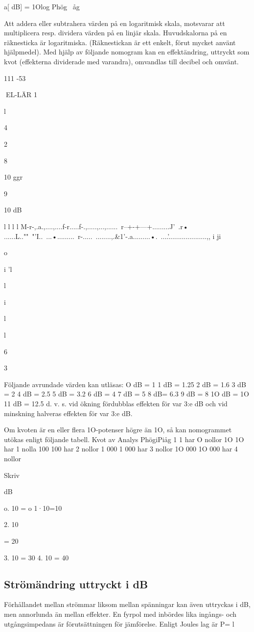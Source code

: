\documentclass[a4paper,twoside,twocolumn,openright]{book}
\begin{document}
{{a[ dB] = 1Olog Phög
~åg

Att addera eller subtrahera värden på en
logaritmisk skala, motsvarar att multiplicera
resp. dividera värden på en linjär skala.
Huvudskalorna på en räknesticka är logaritmiska. (Räknestickan är ett enkelt, förut
mycket använt hjälpmedel).
Med hjälp av följande nomogram kan en
effektändring, uttryckt som kvot (effekterna
dividerade med varandra), omvandlas till
decibel och omvänt.

111 -53

EL-LÄR
1

l

4

2

8

10 ggr

9

10 dB

l
l
l
l
M-r-,.a.,....,....f-r.....f-.,.....,...,......~r--+-+---+.........J'~.r•
......L..""~"'I..~...•.........~r-.....~........,.\&1'-.a.........•.~....'....................,,
i ji

o

i 'l

l

i

l

l

6

3

Följande avrundade värden kan utläsas:
O dB = 1
1 dB = 1.25 2 dB = 1.6
3 dB = 2
4 dB = 2.5
5 dB = 3.2
6 dB = 4
7 dB = 5
8 dB= 6.3
9 dB = 8
1O dB = 1O 11 dB = 12.5
d. v. s. vid ökning fördubblas effekten för var
3:e dB och vid minskning halveras effekten
för var 3:e dB.

Om kvoten är en eller flera 1O-potenser
högre än 1O, så kan nomogrammet utökas
enligt följande tabell.
Kvot av Analys
PhögiPiåg
1
1 har O nollor
1O
1O har 1 nolla
100
100 har 2 nollor
1 000
1 000 har 3 nollor
1O 000 1O 000 har 4 nollor

Skriv

dB

o. 10 = o
1·10=10

2. 10

= 20

3. 10 = 30
4. 10 = 40

\subsection{Strömändring uttryckt i dB}
Förhållandet mellan strömmar liksom mellan spänningar kan även uttryckas i dB, men
annorlunda än mellan effekter. En fyrpol
med inbördes lika ingångs- och utgångsimpedans är förutsättningen för jämförelse.
Enligt Joules lag är P= l

}}
\end{document}
